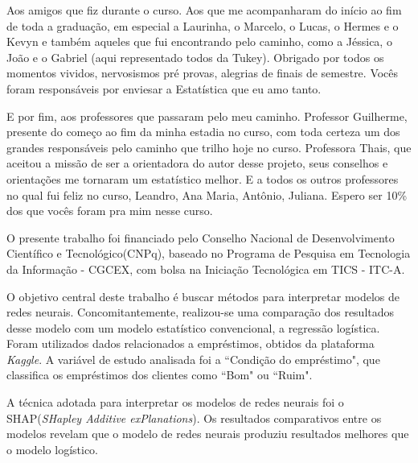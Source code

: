 \documentclass[12pt, a4paper, twoside]{article}
\numberwithin{equation}{subsection} %
\begin{document}
Aos amigos que fiz durante o curso. Aos que me acompanharam do início ao fim de toda a graduação, em especial a Laurinha, o Marcelo, o Lucas, 
o Hermes e o Kevyn e também aqueles que fui encontrando pelo caminho, como a Jéssica, o João e o Gabriel (aqui representado todos da Tukey).
Obrigado por todos os momentos vividos, nervosismos pré provas, alegrias de finais de semestre. Vocês foram responsáveis
por enviesar a Estatística que eu amo tanto.

E por fim, aos professores que passaram pelo meu caminho. Professor Guilherme, presente do começo ao fim da minha estadia no curso,
com toda certeza um dos grandes responsáveis pelo caminho que trilho hoje no curso. Professora Thais, que aceitou a missão de 
ser a orientadora do autor desse projeto, seus conselhos e orientações me tornaram um estatístico melhor. E a todos os outros professores
no qual fui feliz no curso, Leandro, Ana Maria, Antônio, Juliana. Espero ser 10\% dos que vocês foram pra mim nesse curso.

\newpage

\begin{center}
\end{center}
\vspace{1cm}

O presente trabalho foi financiado pelo Conselho Nacional de Desenvolvimento Científico e 
Tecnológico(CNPq), baseado no Programa de Pesquisa em Tecnologia da Informação - CGCEX, 
com bolsa na Iniciação Tecnológica em TICS - ITC-A.


\newpage

\begin{center}
\end{center}

\vspace{1cm}

O objetivo central deste trabalho é buscar métodos para interpretar modelos de redes neurais. 
Concomitantemente, realizou-se uma comparação dos resultados desse modelo
 com um modelo estatístico convencional, a regressão logística. Foram utilizados dados relacionados a empréstimos, 
 obtidos da plataforma \textit{Kaggle}. A variável de estudo analisada foi a ``Condição do empréstimo", que 
 classifica os empréstimos dos clientes como ``Bom" ou ``Ruim".

A técnica adotada para interpretar os modelos de redes neurais foi o SHAP(\textit{SHapley Additive exPlanations}).
Os resultados comparativos entre os modelos revelam que o modelo de redes neurais produziu resultados melhores que
o modelo logístico. 
\end{document}
